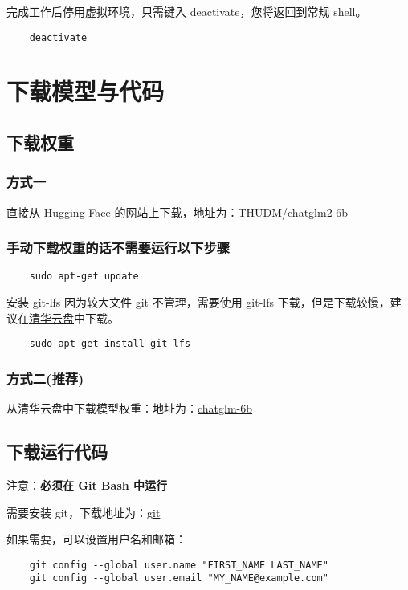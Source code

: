 \documentclass{article}
\begin{document}
完成工作后停用虚拟环境，只需键入 deactivate，您将返回到常规 shell。
\begin{verbatim}
    deactivate
\end{verbatim}


\section{下载模型与代码}
\subsection{下载权重}
\subsubsection{方式一}
直接从 \href{https://huggingface.co/}{Hugging Face} 的网站上下载，地址为：\href{https://huggingface.co/THUDM/chatglm2-6b/tree/main}{THUDM/chatglm2-6b}


\subsubsection{手动下载权重的话不需要运行以下步骤}
\begin{verbatim}
    sudo apt-get update
\end{verbatim}

安装 git-lfs 因为较大文件 git 不管理，需要使用 git-lfs 下载，但是下载较慢，建议在\href{https://cloud.tsinghua.edu.cn/d/fb9f16d6dc8f482596c2/}{清华云盘}中下载。

\begin{verbatim}
    sudo apt-get install git-lfs
\end{verbatim}

\subsubsection{方式二(推荐)}
从清华云盘中下载模型权重：地址为：\href{https://cloud.tsinghua.edu.cn/d/fb9f16d6dc8f482596c2/}{chatglm-6b}

\subsection{下载运行代码\label{download}}
注意：\textbf{必须在 Git Bash 中运行}

需要安装 git，下载地址为：\href{https://git-scm.com/}{git}

如果需要，可以设置用户名和邮箱：
\begin{verbatim}
    git config --global user.name "FIRST_NAME LAST_NAME"
    git config --global user.email "MY_NAME@example.com"
\end{verbatim}
\end{document}
